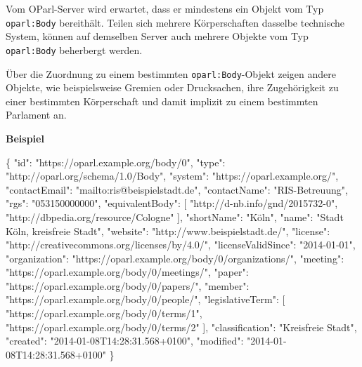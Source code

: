 \documentclass[,a4paper]{article}
\newenvironment{Shaded}{}{}
\newcommand{\DataTypeTok}[1]{\textcolor[rgb]{0.56,0.13,0.00}{{#1}}}
\newcommand{\StringTok}[1]{\textcolor[rgb]{0.25,0.44,0.63}{{#1}}}
\newcommand{\OtherTok}[1]{\textcolor[rgb]{0.00,0.44,0.13}{{#1}}}
\newcommand{\FunctionTok}[1]{\textcolor[rgb]{0.02,0.16,0.49}{{#1}}}
\begin{document}
Vom OParl-Server wird erwartet, dass er mindestens ein Objekt vom Typ
\texttt{oparl:Body} bereithält. Teilen sich mehrere Körperschaften
dasselbe technische System, können auf demselben Server auch mehrere
Objekte vom Typ \texttt{oparl:Body} beherbergt werden.

Über die Zuordnung zu einem bestimmten \texttt{oparl:Body}-Objekt zeigen
andere Objekte, wie beispielsweise Gremien oder Drucksachen, ihre
Zugehörigkeit zu einer bestimmten Körperschaft und damit implizit zu
einem bestimmten Parlament an.

\textbf{Beispiel}

\begin{Shaded}
\begin{Highlighting}[]
\FunctionTok{\{}
    \DataTypeTok{"id"}\FunctionTok{:} \StringTok{"https://oparl.example.org/body/0"}\FunctionTok{,}
    \DataTypeTok{"type"}\FunctionTok{:} \StringTok{"http://oparl.org/schema/1.0/Body"}\FunctionTok{,}
    \DataTypeTok{"system"}\FunctionTok{:} \StringTok{"https://oparl.example.org/"}\FunctionTok{,}
    \DataTypeTok{"contactEmail"}\FunctionTok{:} \StringTok{"mailto:ris@beispielstadt.de"}\FunctionTok{,}
    \DataTypeTok{"contactName"}\FunctionTok{:} \StringTok{"RIS-Betreuung"}\FunctionTok{,}
    \DataTypeTok{"rgs"}\FunctionTok{:} \StringTok{"053150000000"}\FunctionTok{,}
    \DataTypeTok{"equivalentBody"}\FunctionTok{:} \OtherTok{[}
        \StringTok{"http://d-nb.info/gnd/2015732-0"}\OtherTok{,}
        \StringTok{"http://dbpedia.org/resource/Cologne"}
    \OtherTok{]}\FunctionTok{,}
    \DataTypeTok{"shortName"}\FunctionTok{:} \StringTok{"Köln"}\FunctionTok{,}
    \DataTypeTok{"name"}\FunctionTok{:} \StringTok{"Stadt Köln, kreisfreie Stadt"}\FunctionTok{,}
    \DataTypeTok{"website"}\FunctionTok{:} \StringTok{"http://www.beispielstadt.de/"}\FunctionTok{,}
    \DataTypeTok{"license"}\FunctionTok{:} \StringTok{"http://creativecommons.org/licenses/by/4.0/"}\FunctionTok{,}
    \DataTypeTok{"licenseValidSince"}\FunctionTok{:} \StringTok{"2014-01-01"}\FunctionTok{,}
    \DataTypeTok{"organization"}\FunctionTok{:} \StringTok{"https://oparl.example.org/body/0/organizations/"}\FunctionTok{,}
    \DataTypeTok{"meeting"}\FunctionTok{:} \StringTok{"https://oparl.example.org/body/0/meetings/"}\FunctionTok{,}
    \DataTypeTok{"paper"}\FunctionTok{:} \StringTok{"https://oparl.example.org/body/0/papers/"}\FunctionTok{,}
    \DataTypeTok{"member"}\FunctionTok{:} \StringTok{"https://oparl.example.org/body/0/people/"}\FunctionTok{,}
    \DataTypeTok{"legislativeTerm"}\FunctionTok{:} \OtherTok{[}
        \StringTok{"https://oparl.example.org/body/0/terms/1"}\OtherTok{,}
        \StringTok{"https://oparl.example.org/body/0/terms/2"}
    \OtherTok{]}\FunctionTok{,}
    \DataTypeTok{"classification"}\FunctionTok{:} \StringTok{"Kreisfreie Stadt"}\FunctionTok{,}
    \DataTypeTok{"created"}\FunctionTok{:} \StringTok{"2014-01-08T14:28:31.568+0100"}\FunctionTok{,}
    \DataTypeTok{"modified"}\FunctionTok{:} \StringTok{"2014-01-08T14:28:31.568+0100"}
\FunctionTok{\}}
\end{Highlighting}
\end{Shaded}
\end{document}
